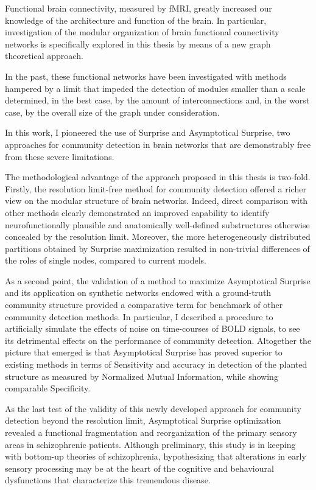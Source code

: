 Functional brain connectivity, measured by fMRI, greatly increased our knowledge of the architecture and function of the brain.
In particular, investigation of the modular organization of brain functional connectivity networks is specifically explored in this thesis by means of a new graph theoretical approach.

In the past, these functional networks have been investigated with methods hampered by a limit that impeded the detection of modules smaller than a scale determined, in the best case, by the amount of interconnections and, in the worst case, by the overall size of the graph under consideration.

In this work, I pioneered the use of Surprise and Asymptotical Surprise, two approaches for community detection in brain networks that are demonstrably free from these severe limitations.

The methodological advantage of the approach proposed in this thesis is two-fold.
Firstly, the resolution limit-free method for community detection offered a richer view on the modular structure of brain networks.
Indeed, direct comparison with other methods clearly demonstrated an improved capability to identify neurofunctionally plausible and anatomically well-defined substructures otherwise concealed by the resolution limit.
Moreover, the more heterogeneously distributed partitions obtained by Surprise maximization resulted in non-trivial differences of the roles of single nodes, compared to current models.

As a second point, the validation of a method to maximize Asymptotical Surprise and its application on synthetic networks endowed with a ground-truth community structure provided a comparative term for benchmark of other community detection methods.
In particular, I described a procedure to artificially simulate the effects of noise on time-courses of BOLD signals, to see its detrimental effects on the performance of community detection.
Altogether the picture that emerged is that Asymptotical Surprise has proved superior to existing methods in terms of Sensitivity and accuracy in detection of the planted structure as measured by Normalized Mutual Information, while showing comparable Specificity.

As the last test of the validity of this newly developed approach for community detection beyond the resolution limit, Asymptotical Surprise optimization revealed a functional fragmentation and reorganization of the primary sensory areas in schizophrenic patients.
Although preliminary, this study is in keeping with bottom-up theories of schizophrenia, hypothesizing that alterations in early sensory processing may be at the heart of the cognitive and behavioural dysfunctions that characterize this tremendous disease.


